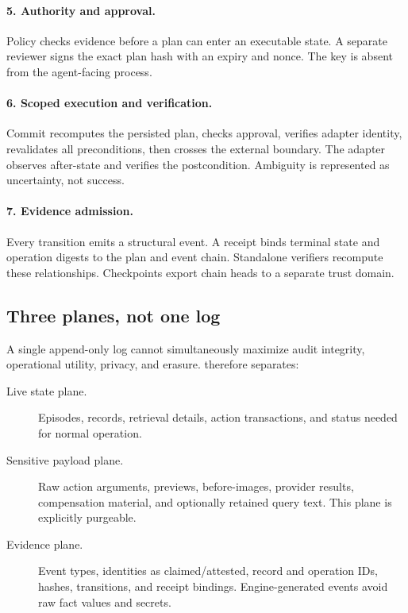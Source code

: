 \paragraph{5. Authority and approval.} Policy checks evidence before a plan can enter an executable state. A separate reviewer signs the exact plan hash with an expiry and nonce. The key is absent from the agent-facing process.

\paragraph{6. Scoped execution and verification.} Commit recomputes the persisted plan, checks approval, verifies adapter identity, revalidates all preconditions, then crosses the external boundary. The adapter observes after-state and verifies the postcondition. Ambiguity is represented as uncertainty, not success.

\paragraph{7. Evidence admission.} Every transition emits a structural event. A receipt binds terminal state and operation digests to the plan and event chain. Standalone verifiers recompute these relationships. Checkpoints export chain heads to a separate trust domain.

\subsection{Three planes, not one log}

A single append-only log cannot simultaneously maximize audit integrity, operational utility, privacy, and erasure. \system{} therefore separates:

\begin{description}
  \item[Live state plane.] Episodes, records, retrieval details, action transactions, and status needed for normal operation.
  \item[Sensitive payload plane.] Raw action arguments, previews, before-images, provider results, compensation material, and optionally retained query text. This plane is explicitly purgeable.
  \item[Evidence plane.] Event types, identities as claimed/attested, record and operation IDs, hashes, transitions, and receipt bindings. Engine-generated events avoid raw fact values and secrets.
\end{description}

